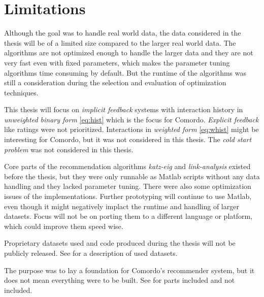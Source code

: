 
\section{Limitations}\label{sec:intro:limitations}

Although the goal was to handle real world data, the data considered in the thesis will be of a limited size compared to the larger real world data. The algorithms are not optimized enough to handle the larger data and they are not very fast even with fixed parameters, which makes the parameter tuning algorithms time consuming by default. But the runtime of the algorithms was still a consideration during the selection and evaluation of optimization techniques.

This thesis will focus on \textit{implicit feedback} systems with interaction history in \textit{unweighted binary form} \eqref{eq:hist} which is the focus for Comordo. \textit{Explicit feedback} like ratings were not prioritized. Interactions in \textit{weighted form} \eqref{eq:whist} might be interesting for Comordo, but it was not considered in this thesis. The \textit{cold start problem} \citep{cacheda2011comparison} was not considered in this thesis.

Core parts of the recommendation algorithms \textit{katz-eig} and \textit{link-analysis} existed before the thesis, but they were only runnable as Matlab scripts without any data handling and they lacked parameter tuning. There were also some optimization issues of the implementations. Further prototyping will continue to use Matlab, even though it might negatively implact the runtime and handling of larger datasets.
Focus will not be on porting them to a different language or platform, which could improve them speed wise.


Proprietary datasets used and code produced during the thesis will not be publicly released. See  for a description of used datasets.

The purpose was to lay a foundation for Comordo's recommender system, but it does not mean everything were to be built. See  for parts included and not included.

